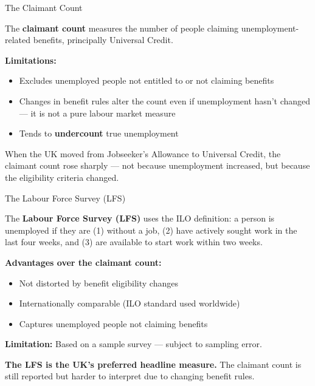 \documentclass[16pt,aspectratio=169]{beamer}
\begin{document}
\begin{frame}{The Claimant Count}
    \begin{definition}
        The \textbf{claimant count} measures the number of people claiming unemployment-related benefits, principally Universal Credit.
    \end{definition}

    \vspace{0.6em}
    \textbf{Limitations:}
    \begin{itemize}
        \item Excludes unemployed people not entitled to or not claiming benefits
        \item Changes in benefit rules alter the count even if unemployment hasn't changed --- it is not a pure labour market measure
        \item Tends to \textbf{undercount} true unemployment
    \end{itemize}

    \vspace{0.4em}
    \begin{example}
        When the UK moved from Jobseeker's Allowance to Universal Credit, the claimant count rose sharply --- not because unemployment increased, but because the eligibility criteria changed.
    \end{example}
\end{frame}

\begin{frame}{The Labour Force Survey (LFS)}
    \begin{definition}
        The \textbf{Labour Force Survey (LFS)} uses the ILO definition: a person is unemployed if they are (1) without a job, (2) have actively sought work in the last four weeks, and (3) are available to start work within two weeks.
    \end{definition}

    \vspace{0.4em}
    \textbf{Advantages over the claimant count:}
    \begin{itemize}
        \item Not distorted by benefit eligibility changes
        \item Internationally comparable (ILO standard used worldwide)
        \item Captures unemployed people not claiming benefits
    \end{itemize}

    \vspace{0.3em}
    \textbf{Limitation:} Based on a sample survey --- subject to sampling error.

    \vspace{0.3em}
    \textbf{The LFS is the UK's preferred headline measure.} The claimant count is still reported but harder to interpret due to changing benefit rules.
\end{frame}
\end{document}
